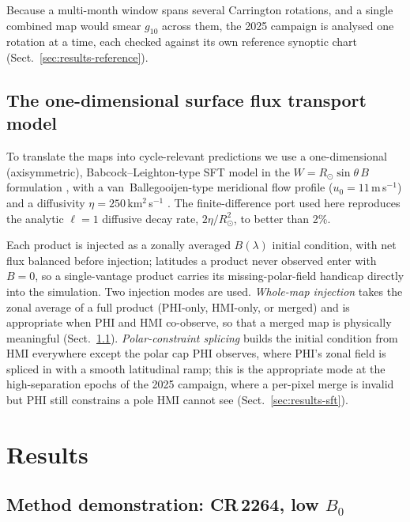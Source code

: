 \documentclass{aa}
\begin{document}
Because a multi-month window spans several Carrington rotations, and a single combined map would smear $g_{10}$ across them, the 2025 campaign is analysed one rotation at a time, each checked against its own reference synoptic chart (Sect.~\ref{sec:results-reference}).

\subsection{The one-dimensional surface flux transport model}
\label{sec:methods-sft}

To translate the maps into cycle-relevant predictions we use a one-dimensional (axisymmetric), Babcock--Leighton-type SFT model \citep{Babcock1961,Leighton1969,Sheeley2005} in the $W = R_\odot \sin\theta\, B$ formulation \citep{WangSheeley1991}, with a van~Ballegooijen-type meridional flow profile ($u_0 = 11$\,m\,s$^{-1}$) and a diffusivity $\eta = 250$\,km$^2$\,s$^{-1}$ \citep{vanBallegooijen1998,Wang2017}. The finite-difference port used here reproduces the analytic $\ell = 1$ diffusive decay rate, $2\eta/R_\odot^2$, to better than 2\%.

Each product is injected as a zonally averaged $B(\lambda)$ initial condition, with net flux balanced before injection; latitudes a product never observed enter with $B = 0$, so a single-vantage product carries its missing-polar-field handicap directly into the simulation. Two injection modes are used. \emph{Whole-map injection} takes the zonal average of a full product (PHI-only, HMI-only, or merged) and is appropriate when PHI and HMI co-observe, so that a merged map is physically meaningful (Sect.~\ref{sec:results-demo}). \emph{Polar-constraint splicing} builds the initial condition from HMI everywhere except the polar cap PHI observes, where PHI's zonal field is spliced in with a smooth latitudinal ramp; this is the appropriate mode at the high-separation epochs of the 2025 campaign, where a per-pixel merge is invalid but PHI still constrains a pole HMI cannot see (Sect.~\ref{sec:results-sft}).

\section{Results}
\label{sec:results}

\subsection{Method demonstration: CR\,2264, low $B_0$}
\label{sec:results-demo}
\end{document}
